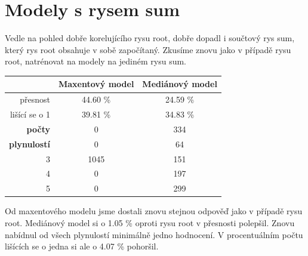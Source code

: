 \documentclass[12pt,a4paper]{report}
\begin{document}
\section{Modely s rysem sum}
Vedle na pohled dobře korelujícího rysu root, dobře dopadl i součtový rys sum, který rys root obsahuje v sobě započítaný. Zkusíme znovu jako v případě rysu root, natrénovat na modely na jediném rysu sum.
\begin{center}
\begin{tabular}{|r|c|c|}
\hline
 & \textbf{Maxentový model} & \textbf{Mediánový model} \\
 \hline
     přesnost & 44.60 \%  & 24.59 \%  \\
\hline
lišící se o 1 & 39.81 \% & 34.83 \%  \\
\hline
     \textbf{počty} \quad 1 & \color{red}0   & \color{OliveGreen}334   \\
\textbf{plynulostí} \quad 2 & \color{red}0 & \color{OliveGreen}64   \\
                          3 & 1045 & \color{OliveGreen}151 \\
                          4 & \color{red}0   & \color{OliveGreen}197 \\
                          5 & \color{red}0   & \color{OliveGreen}299  \\
\hline
\end{tabular}
\end{center}
Od maxentového modelu jsme dostali znovu stejnou odpověď jako v případě rysu root. Mediánový model si o 1.05 \% oproti rysu root v přesnosti polepšil. Znovu nabídnul od všech plynulostí minimálně jedno hodnocení. V procentuálním počtu lišících se o jedna si ale o 4.07 \% pohoršil.
\end{document}
